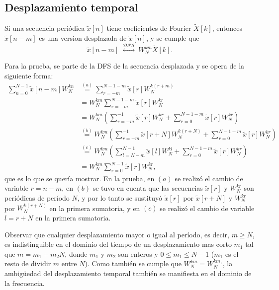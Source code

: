 \documentclass[a4paper]{report}
\begin{document}
\subsection{Desplazamiento temporal}\label{sec:dft_dfs_properties_time_frequency_shift}

Si una secuencia periódica \(\tilde{x}[n]\) tiene coeficientes de Fourier \(\tilde{X}[k]\), entonces \(\tilde{x}[n-m]\) es una version desplazada de \(\tilde{x}[n]\), y se cumple que 
\begin{equation}\label{eq:dft_dfs_properties_temporal_shift}
 \tilde{x}[n-m]\;\overset{\mathcal{DFS}}{\longleftrightarrow}\;W_N^{km}\tilde{X}[k]. 
\end{equation}

Para la prueba, se parte de la DFS de la secuencia desplazada y se opera de la siguiente forma:
\begin{align*}
 \sum_{n=0}^{N-1}\tilde{x}[n-m]W_N^{kn}&\overset{(a)}{=}\sum_{r=-m}^{N-1-m}\tilde{x}[r]W_N^{k(r+m)}\\
  &=W_N^{km}\sum_{r=-m}^{N-1-m}\tilde{x}[r]W_N^{kr}\\
  &=W_N^{km}\left(\sum_{r=-m}^{-1}\tilde{x}[r]W_N^{kr}+\sum_{r=0}^{N-1-m}\tilde{x}[r]W_N^{kr}\right)\\
  &\overset{(b)}{=}W_N^{km}\left(\sum_{r=-m}^{-1}\tilde{x}[r+N]W_N^{k(r+N)}+\sum_{r=0}^{N-1-m}\tilde{x}[r]W_N^{kr}\right)\\
  &\overset{(c)}{=}W_N^{km}\left(\sum_{l=N-m}^{N-1}\tilde{x}[l]W_N^{kl}+\sum_{r=0}^{N-1-m}\tilde{x}[r]W_N^{kr}\right)\\
  &=W_N^{km}\sum_{r=0}^{N-1}\tilde{x}[r]W_N^{kr},
\end{align*}
que es lo que se quería mostrar. En la prueba, en \((a)\) se realizó el cambio de variable \(r=n-m\), en \((b)\) se tuvo en cuenta que las secuencias \(\tilde{x}[r]\) y \(W_N^{kr}\) son periódicas de período \(N\), y por lo tanto se sustituyó \(\tilde{x}[r]\) por \(\tilde{x}[r+N]\) y \(W_N^{kr}\) por \(W_N^{k(r+N)}\) en la primera sumatoria, y en \((c)\) se realizó el cambio de variable \(l=r+N\) en la primera sumatoria.

Observar que cualquier desplazamiento mayor o igual al período, es decir, \(m\geq N\), es indistinguible en el dominio del tiempo de un desplazamiento mas corto \(m_1\) tal que \(m=m_1+m_2N\), donde \(m_1\) y \(m_2\) son enteros y \(0\leq m_1\leq N-1\) (\(m_1\) es el resto de dividir \(m\) entre \(N\)). Como también se cumple que \(W_N^{km}=W_N^{km_1}\), la ambigüedad del desplazamiento temporal también se manifiesta en el dominio de la frecuencia.
\end{document}
